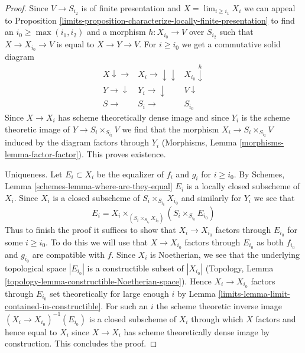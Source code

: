 \begin{proof}

Since $V \to S_{i_2}$ is of finite presentation and
$X = \lim_{i \geq i_1} X_i$ we can appeal to Proposition
\ref{limits-proposition-characterize-locally-finite-presentation}
to find an $i_0 \geq \max(i_1, i_2)$ and a morphism $h : X_{i_0} \to V$
over $S_{i_2}$ such that $X \to X_{i_0} \to V$ is equal to $X \to Y \to V$.
For $i \geq i_0$ we get a commutative solid diagram
$$
\begin{array}{ccc}X \downarrow\longrightarrow & X_i \longrightarrow\downarrow\downarrow & X_{i_0} \overset{h}{\downarrow} \\ Y \longrightarrow\downarrow & Y_i \longrightarrow\downarrow & V \downarrow \\ S \longrightarrow & S_i \longrightarrow & S_{i_0}\end{array}
$$
Since $X \to X_i$ has scheme theoretically dense image
and since $Y_i$ is the scheme theoretic image of
$Y \to S_i \times_{S_{i_2}} V$
we find that the morphism $X_i \to S_i \times_{S_{i_2}} V$
induced by the diagram
factors through $Y_i$ (Morphisms, Lemma \ref{morphisms-lemma-factor-factor}).
This proves existence.

\medskip\noindent
Uniqueness. Let $E_i \subset X_i$ be the equalizer of $f_i$ and $g_i$
for $i \geq i_0$. By
Schemes, Lemma \ref{schemes-lemma-where-are-they-equal}
$E_i$ is a locally closed subscheme of $X_i$.
Since $X_i$ is a closed subscheme of $S_i \times_{S_{i_0}} X_{i_0}$
and similarly for $Y_i$ we see that
$$
E_i = X_i \times_{(S_i \times_{S_{i_0}} X_{i_0})} (S_i \times_{S_{i_0}} E_{i_0})
$$
Thus to finish the proof it suffices to show that $X_i \to X_{i_0}$
factors through $E_{i_0}$ for some $i \geq i_0$.
To do this we will use that $X \to X_{i_0}$ factors through $E_{i_0}$
as both $f_{i_0}$ and $g_{i_0}$ are compatible with $f$.
Since $X_i$ is Noetherian, we see that the underlying
topological space $|E_{i_0}|$ is a constructible subset of $|X_{i_0}|$
(Topology, Lemma \ref{topology-lemma-constructible-Noetherian-space}).
Hence $X_i \to X_{i_0}$ factors through $E_{i_0}$ set theoretically
for large enough $i$ by Lemma \ref{limits-lemma-limit-contained-in-constructible}.
For such an $i$ the scheme theoretic inverse image
$(X_i \to X_{i_0})^{-1}(E_{i_0})$ is a closed subscheme of $X_i$
through which $X$ factors and hence equal to $X_i$ since
$X \to X_i$ has scheme theoretically dense image by construction.
This concludes the proof.
\end{proof}

